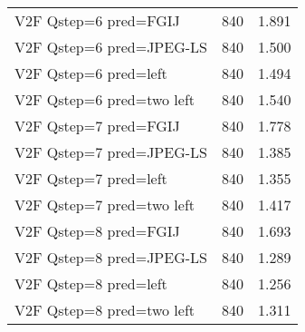 \begin{tabular}{lrr}
V2F Qstep=6 pred=FGIJ & 840 & 1.891 \\
V2F Qstep=6 pred=JPEG-LS & 840 & 1.500 \\
V2F Qstep=6 pred=left & 840 & 1.494 \\
V2F Qstep=6 pred=two left & 840 & 1.540 \\
V2F Qstep=7 pred=FGIJ & 840 & 1.778 \\
V2F Qstep=7 pred=JPEG-LS & 840 & 1.385 \\
V2F Qstep=7 pred=left & 840 & 1.355 \\
V2F Qstep=7 pred=two left & 840 & 1.417 \\
V2F Qstep=8 pred=FGIJ & 840 & 1.693 \\
V2F Qstep=8 pred=JPEG-LS & 840 & 1.289 \\
V2F Qstep=8 pred=left & 840 & 1.256 \\
V2F Qstep=8 pred=two left & 840 & 1.311 \\
\end{tabular}
